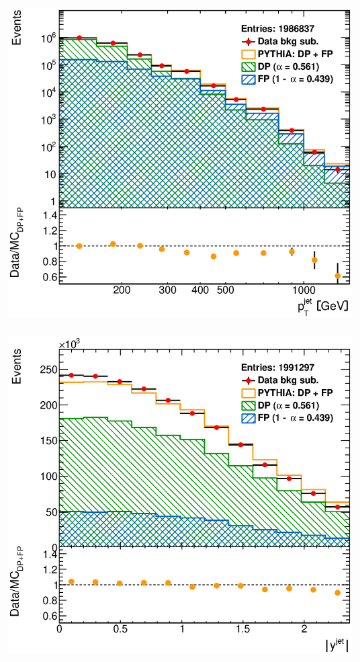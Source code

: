 \documentclass[12pt, twoside]{article}
\numberwithin{equation}{section}
\numberwithin{figure}{section}
\newenvironment{changemargin}[2]{%
\begin{list}{}{%
\setlength{\topsep}{0pt}%
\setlength{\leftmargin}{#1}%
\setlength{\rightmargin}{#2}%
\setlength{\listparindent}{\parindent}%
\setlength{\itemindent}{\parindent}%
\setlength{\parsep}{\parskip}%
}%
\item[]}{\end{list}}
\begin{document}
\begin{figure}[H]
\begin{changemargin}{-1.0cm}{-0.75cm}
\begin{changemargin}{-0.75cm}{-1.0cm}
        \vspace{0.2cm}
        \begin{subfigure}[b]{0.37\textwidth}
            \includegraphics[width=\textwidth]{./images/BackgroundSubtractedPythiaOptimised/OPT_SIG_EVENTS-104.eps}
            \subcaption{}
            \label{fig:BSPtJetPYTHIA_Optimised}
        \end{subfigure}
        \begin{subfigure}[b]{0.37\textwidth}
            \includegraphics[width=\textwidth]{./images/BackgroundSubtractedPythiaOptimised/OPT_SIG_EVENTS-105.eps}

\end{subfigure}
\end{changemargin}
\end{changemargin}
\end{figure}
\end{document}
